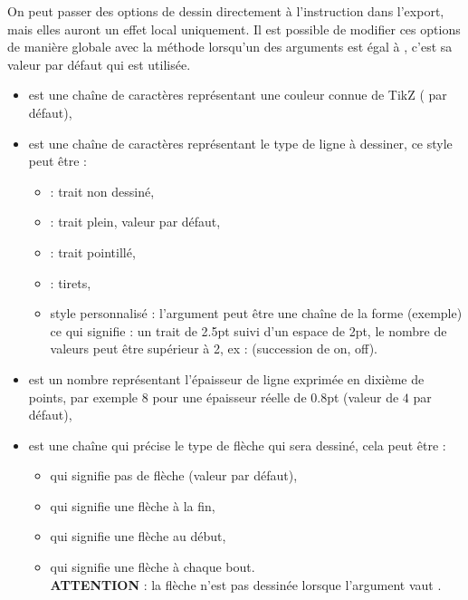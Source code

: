 On peut passer des options de dessin directement à l'instruction \drawcmd dans l'export, mais elles auront un effet local uniquement. Il est possible de modifier ces options de manière globale avec la méthode  lorsqu'un des arguments est égal à \nil, c'est sa valeur par défaut qui est utilisée.

\begin{itemize}
\item {} est une chaîne de caractères représentant une couleur connue de TikZ ( par défaut),
\item {} est une chaîne de caractères représentant le type de ligne à dessiner, ce style peut être :
 \begin{itemize}
  \item {} : trait non dessiné,
  \item {} : trait plein, valeur par défaut,
  \item {} : trait pointillé,
  \item {} : tirets,
  \item style personnalisé : l'argument  peut être une chaîne de la forme (exemple)  ce qui signifie : un trait de 2.5pt suivi d'un espace de 2pt, le nombre de valeurs peut être supérieur à 2, ex :  (succession de on, off).
  \end{itemize}
\item {} est un nombre représentant l'épaisseur de ligne exprimée en dixième de points, par exemple $8$ pour une épaisseur réelle de 0.8pt (valeur de $4$ par défaut),
\item {} est une chaîne qui précise le type de flèche qui sera dessiné, cela peut être :
 \begin{itemize}
  \item {} qui signifie pas de flèche (valeur par défaut),
  \item {} qui signifie une flèche à la fin,
  \item {} qui signifie une flèche au début,
  \item {} qui signifie une flèche à chaque bout.\\
  \textbf{ATTENTION} : la flèche n'est pas dessinée lorsque l'argument  vaut \true.
  \end{itemize}
\end{itemize}


